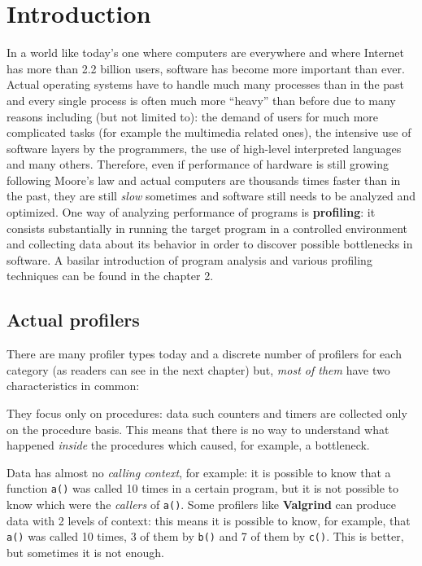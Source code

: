 \documentclass[a4paper,10pt]{report}
\begin{document}
\tableofcontents

\chapter{Introduction}

In a world like today's one where computers are everywhere and where
\mbox{Internet} has more than 2.2 billion users, software has become more
important than ever. Actual operating systems have to handle much many
processes than in the past and every single process is often much more ``heavy''
than before due to many reasons including (but not limited to): the
demand of users for much more complicated tasks (for example the multimedia
related ones), the intensive use of software layers by the programmers, the use
of high-level interpreted languages and many others. Therefore, even if performance
of hardware is still growing following Moore's law and actual computers are
thousands times faster than in the past, they are still \emph{slow} sometimes and
software still needs to be analyzed and optimized. One way of analyzing
performance of programs is \textbf{profiling}: it consists substantially in
running the target program in a controlled environment and collecting data about
its behavior in order to discover possible bottlenecks in software. A basilar
introduction of program analysis and various profiling techniques can be found
in the chapter 2.

\section{Actual profilers}

There are many profiler types today and a discrete number of profilers for
each category (as readers can see in the next chapter) but, \emph{most of them}
have two characteristics in common:

\begin{itemize*}

\item They focus only on procedures: data such counters and timers are collected
only on the procedure basis. This means that there is no way to understand what
happened \emph{inside} the procedures which caused, for example, a bottleneck.

\item Data has almost no \emph{calling context}, for example: it is possible to know that
a function \verb|a()| was called 10 times in a certain program, but it is not possible to know which were the \emph{callers} of \verb|a()|. Some profilers like \textbf{Valgrind} can
produce data with 2 levels of context: this means it is possible to know, for
example, that \verb|a()| was called 10 times, 3 of them by \verb|b()| and 7 of them by  \verb|c()|. This is better, but sometimes
it is not enough.

\end{itemize*}
\end{document}
